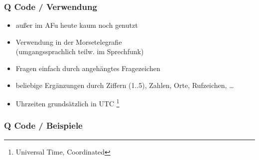 \begin{frame}
    \frametitle{Q Code / Verwendung}

    \begin{itemize}
        \item außer im AFu heute kaum noch genutzt
        \item Verwendung in der Morsetelegrafie \\
              (umgangssprachlich teilw. im Sprechfunk)
        \item Fragen einfach durch angehängtes Fragezeichen
        \item beliebige Ergänzungen durch Ziffern (1..5), Zahlen, Orte, Rufzeichen, \ldots
        \item Uhrzeiten grundsätzlich in UTC
              \footnote{\tiny Universal Time, Coordinated}
    \end{itemize}
    
\end{frame}

\begin{frame}
       \frametitle{Q Code / Beispiele}





\end{frame}

